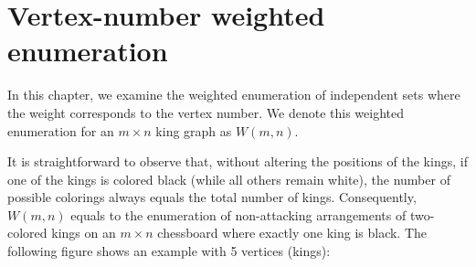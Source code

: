 \documentclass[11pt]{article}
\begin{document}
    \section{Vertex-number weighted enumeration}

    In this chapter, we examine the weighted enumeration of independent sets where the weight corresponds to the vertex number.
    We denote this weighted enumeration for an $m\times n$ king graph as $W(m,n)$.

    It is straightforward to observe that, without altering the positions of the kings, if one of the kings is colored black (while all others remain white), the number of possible colorings always equals the total number of kings.
    Consequently, $W(m,n)$ equals to the enumeration of non-attacking arrangements of two-colored kings on an $m\times n$ chessboard where exactly one king is black.
    The following figure shows an example with 5 vertices (kings):
\end{document}
